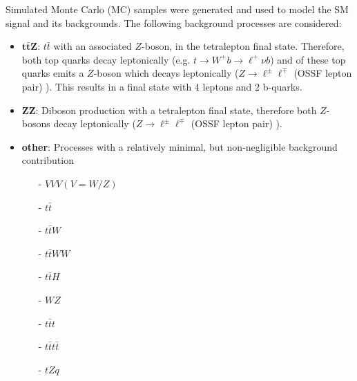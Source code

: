 Simulated Monte Carlo (MC) samples were generated and used to model the SM \tWZ signal and its backgrounds. The following background processes are considered:
\begin{itemize}
	\item $\mathbf{t \bar{t} Z}$: $t \bar{t} $  with an associated $Z$-boson, in the tetralepton final state. Therefore, both top quarks decay leptonically (e.g. $t \rightarrow W^+ b \rightarrow \ell^+ \nu b$) and of these top quarks emits a $Z$-boson which decays leptonically ($Z \rightarrow \ell^\pm \ell^\mp$ (OSSF lepton pair) ). This results in a final state with 4 leptons and 2 b-quarks.
	\item $\mathbf{ZZ}$: Diboson production with a tetralepton final state, therefore both $Z$-bosons decay leptonically ($Z \rightarrow \ell^\pm \ell^\mp$ (OSSF lepton pair) ).
	\item \textbf{other}: Processes with a relatively minimal, but non-negligible background contribution
	\begin{itemize}
	\item [-] $VVV (V=W/Z)$
	\item [-] $t\bar{t}$
	\item [-] $t\bar{t}W$
	\item [-] $t\bar{t}WW$
	\item [-] $t\bar{t}H$
	\item [-] $WZ$
	\item [-] $t\bar{t}t$
	\item [-] $t\bar{t}t\bar{t}$
	\item [-] $tZq$
	\end{itemize}

\end{itemize}
